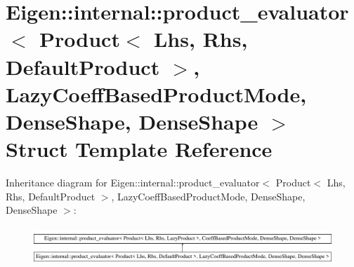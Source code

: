 \hypertarget{struct_eigen_1_1internal_1_1product__evaluator_3_01_product_3_01_lhs_00_01_rhs_00_01_default_pro06ca9210bc576c533682d6dfc3cec111}{}\section{Eigen\+::internal\+::product\+\_\+evaluator$<$ Product$<$ Lhs, Rhs, Default\+Product $>$, Lazy\+Coeff\+Based\+Product\+Mode, Dense\+Shape, Dense\+Shape $>$ Struct Template Reference}
\label{struct_eigen_1_1internal_1_1product__evaluator_3_01_product_3_01_lhs_00_01_rhs_00_01_default_pro06ca9210bc576c533682d6dfc3cec111}
Inheritance diagram for Eigen\+::internal\+::product\+\_\+evaluator$<$ Product$<$ Lhs, Rhs, Default\+Product $>$, Lazy\+Coeff\+Based\+Product\+Mode, Dense\+Shape, Dense\+Shape $>$\+:\begin{figure}[H]
\begin{center}
\leavevmode
\includegraphics[height=1.428571cm]{struct_eigen_1_1internal_1_1product__evaluator_3_01_product_3_01_lhs_00_01_rhs_00_01_default_pro06ca9210bc576c533682d6dfc3cec111}
\end{center}
\end{figure}

